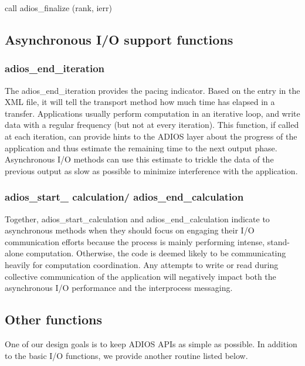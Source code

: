 call adios\_finalize (rank, ierr)

\subsection{Asynchronous I/O support functions}

\subsubsection{adios\_end\_iteration}

The adios\_end\_iteration provides the pacing indicator. Based on the entry in 
the XML file, it will tell the transport method how much time has elapsed in a 
transfer. Applications usually perform computation in an iterative loop, and write
data with a regular frequency (but not at every iteration). This function, if called
at each iteration, can provide hints to the ADIOS layer about the progress of the 
application and thus estimate the remaining time to the next output phase. Asynchronous
I/O methods can use this estimate to trickle the data of the previous output as slow
as possible to minimize interference with the application. 

\subsubsection{adios\_start\_ calculation/ adios\_end\_calculation}

Together, adios\_start\_calculation and adios\_end\_calculation indicate  
to asynchronous methods when they should focus on engaging their I/O communication 
efforts because the process is mainly performing intense, stand-alone computation. 
Otherwise, the code is deemed likely to be communicating heavily for computation 
coordination. Any attempts to write or read during collective communication of 
the application will negatively 
impact both the asynchronous I/O performance and the interprocess messaging.

\subsection{Other functions}

One of our design goals is to keep ADIOS APIs as simple as possible. In addition 
to the basic I/O functions, we provide another routine listed below. 

